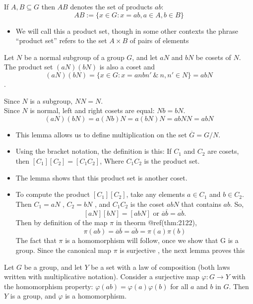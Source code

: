 \documentclass[
]{book}
\providecommand{\tightlist}{%
  \setlength{\itemsep}{0pt}\setlength{\parskip}{0pt}}
\begin{document}
If \(A,B \subseteq G\) then \(AB\) denotes the set of products \(ab\):
\[AB:=\{x\in G: x=ab, a\in A, b\in B\}\]

\begin{itemize}
\tightlist
\item
  We will call this a product set, though in some other contexts the
  phrase ``product set'' refers to the set \(A \times B\) of pairs of
  elements
\end{itemize}

\leavevmode{}%
Let \(N\) be a normal subgroup of a group \(G\), and let \(a N\) and
\(b N\) be cosets of \(N\). The product set \((aN )(bN )\) is also a
coset and \[(aN )(bN )=\{x\in G: x=anbn' ~\& ~ n,n'\in N\}=abN\].

Since \(N\) is a subgroup, \(N N = N\).\\
Since \(N\) is normal, left and right cosets are equal: \(N b = bN\).
\[(aN )(bN ) = a (N b )N = a (b N )N = a b N N = abN\]

\begin{itemize}
\tightlist
\item
  This lemma allows us to define multiplication on the set
  \(\overline{G} = G / N\).
\item
  Using the bracket notation, the definition is this: If \(C_1\) and
  \(C_2\) are cosets, then \([C_1][C_2] = [C_1 C_2]\), Where \(C_1 C_2\)
  is the product set.
\item
  The lemma shows that this product set is another coset.\\
\item
  To compute the product \([C_1][C_2]\), take any elements \(a \in C_1\)
  and \(b \in C_2\). Then \(C_1 = aN\) , \(C_2 = bN\) , and \(C_1 C_2\)
  is the coset \(a b N\) that contains \(ab\). So,
  \[[aN][bN] = [abN] \text{ or } \overline{a}\overline{b} = \overline{ab}.\]
  Then by definition of the map \(\pi\) in theorm @ref(thm:2122),
  \[\pi(ab)=\overline{a}\overline{b} = \overline{ab}=\pi(a)\pi(b)\] The
  fact that \(\pi\) is a homomorphism will follow, once we show that G
  is a group. Since the canonical map \(\pi\) is surjective , the next
  lemma proves this
\end{itemize}

\leavevmode{}%
Let \(G\) be a group, and let \(Y\) be a set with a law of composition
(both laws written with multiplicative notation). Consider a surjective
map \(\varphi : G \to Y\) with the homomorphism property:
\(\varphi(ab) = \varphi(a)\varphi(b)\) for all \(a\) and \(b\) in \(G\).
Then \(Y\) is a group, and \(\varphi\) is a homomorphism.
\end{document}
